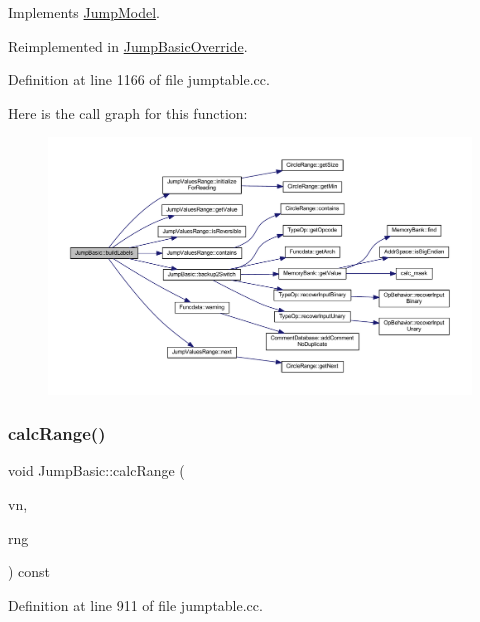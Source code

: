 Implements \mbox{\hyperlink{class_jump_model_af8e7b936b4b51d87b7690693f756ffd6}{Jump\+Model}}.



Reimplemented in \mbox{\hyperlink{class_jump_basic_override_a1fff9a672edb2225dae051d7ed6b57b5}{Jump\+Basic\+Override}}.



Definition at line 1166 of file jumptable.\+cc.

Here is the call graph for this function\+:
\nopagebreak
\begin{figure}[H]
\begin{center}
\leavevmode
\includegraphics[width=350pt]{class_jump_basic_ad3c8a1257f973c18e25935ee932076c4_cgraph}
\end{center}
\end{figure}
\mbox{\label{class_jump_basic_ad7d08e00d715fb0b2edce7d4d09a71f2}} 
\subsubsection{\texorpdfstring{calcRange()}{calcRange()}}
{\footnotesize\ttfamily void Jump\+Basic\+::calc\+Range (\begin{DoxyParamCaption}\item[{\mbox{\hyperlink{class_varnode}{Varnode}} $\ast$}]{vn,  }\item[{\mbox{\hyperlink{class_circle_range}{Circle\+Range}} \&}]{rng }\end{DoxyParamCaption}) const\hspace{0.3cm}{\ttfamily [protected]}}



Definition at line 911 of file jumptable.\+cc.

